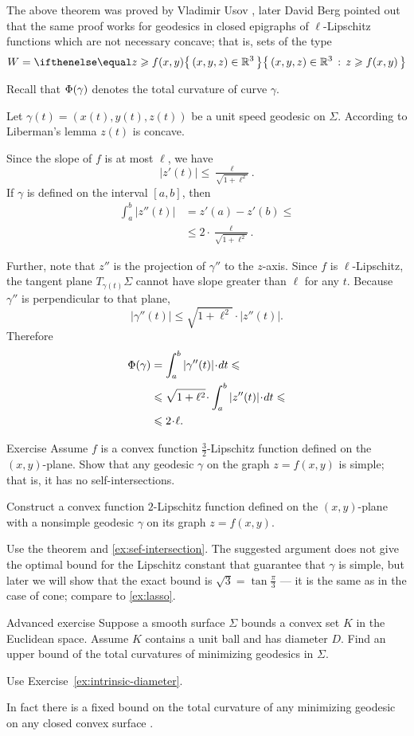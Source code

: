 The above theorem was proved by Vladimir Usov \cite{usov},
later David Berg \cite{berg} pointed out that the same proof works for geodesics in closed epigraphs of $\ell$-Lipschitz functions which are not necessary concave; that is, sets of the type 
\[W=\set{(x,y,z)\in\RR^3}{z\ge f(x,y)}\]

Recall that $\Phi({\gamma})$ denotes the total curvature of curve $\gamma$.

Let $\gamma(t)=(x(t),y(t),z(t))$ be a unit speed geodesic on $\Sigma$.
According to Liberman's lemma 
$z(t)$ is concave.

Since the slope of $f$ is at most $\ell$, we have
\[|z'(t)|\le \tfrac{\ell}{\sqrt{1+\ell^2}}.\]
If $\gamma$ is defined on the interval $[a,b]$, then
\begin{align*}
\int_a^b |z''(t)|&=z'(a)-z'(b)\le 
\\
&\le 2\cdot \tfrac{\ell}{\sqrt{1+\ell^2}}.
\end{align*}

Further, note that $z''$ is the projection of $\gamma''$ to the $z$-axis.
Since $f$ is $\ell$-Lipschitz, the tangent plane $T_{\gamma (t)} \Sigma$ cannot have slope greater than $\ell$ for any $t$.
Because $\gamma ''$ is perpendicular to that plane, 
\[|\gamma'' (t)|  \le \sqrt{1+ \ell ^2} \cdot|z''(t)| .\]
Therefore 
\begin{align*}
\tc\gamma&=\int_a^b|\gamma'' (t)|\cdot dt\le 
\\
&\le \sqrt{1+ \ell ^2}\cdot  \int_a^b |z''(t)|\cdot dt\le 
\\
&\le 2\cdot \ell.
\end{align*}
\qedsf

\begin{thm}{Exercise}
Assume $f$ is a convex function $\tfrac32$-Lipschitz function defined on the $(x,y)$-plane.
Show that any geodesic $\gamma$ on the graph $z=f(x,y)$ is simple;
that is, it has no self-intersections.

Construct a convex function $2$-Lipschitz function defined on the $(x,y)$-plane
with a nonsimple geodesic $\gamma$ on its graph $z=f(x,y)$.
\end{thm}

 Use the theorem and \ref{ex:sef-intersection}.
The suggested argument does not give the optimal bound for the Lipschitz constant that guarantee that $\gamma$ is simple, but
later we will show that the exact bound is $\sqrt{3}=\tan\tfrac\pi3$ --- it is the same as in the case of cone; compare to \ref{ex:lasso}.  %


\begin{thm}{Advanced exercise}
Suppose a smooth surface $\Sigma$ bounds a convex set $K$ in the Euclidean space.
Assume $K$ contains a unit ball and has diameter $D$.
Find an upper bound of the total curvatures of minimizing geodesics in $\Sigma$.
\end{thm}

 Use Exercise~\ref{ex:intrinsic-diameter}.

In fact there is a fixed bound on the total curvature of any minimizing geodesic on any closed convex surface \cite{lebedeva-petrunin}.



